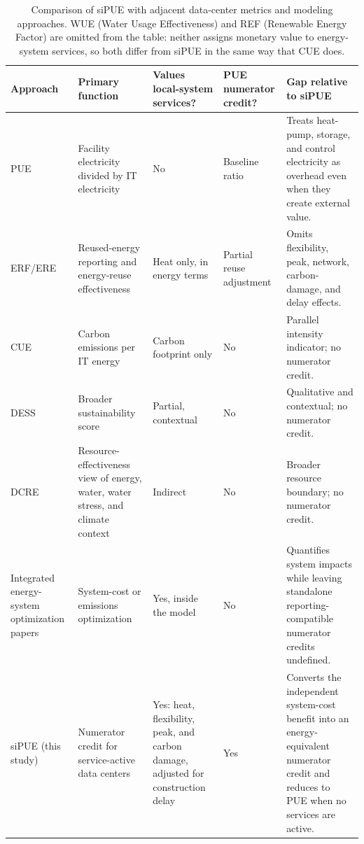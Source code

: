 \documentclass[preprint,12pt]{elsarticle}
\begin{document}
\begin{table}[tbp]
\centering
\scriptsize
\setlength{\tabcolsep}{3pt}
\renewcommand{\arraystretch}{1.12}
\caption{Comparison of siPUE with adjacent data-center metrics and modeling approaches. WUE (Water Usage Effectiveness) and REF (Renewable Energy Factor) are omitted from the table: neither assigns monetary value to energy-system services, so both differ from siPUE in the same way that CUE does.}
\label{tab:metric-novelty-comparison}
\begin{tabularx}{\linewidth}{L{2.05cm} L{2.25cm} L{1.65cm} L{1.85cm} Y}
\toprule
Approach & Primary function & Values local-system services? & PUE numerator credit? & Gap relative to siPUE \\
\midrule
PUE \cite{Belady2008PUE,EUDataCenterDirective2023} & Facility electricity divided by IT electricity & No & Baseline ratio & Treats heat-pump, storage, and control electricity as overhead even when they create external value. \\
ERF/ERE \cite{EUDataCenterDirective2023} & Reused-energy reporting and energy-reuse effectiveness & Heat only, in energy terms & Partial reuse adjustment & Omits flexibility, peak, network, carbon-damage, and delay effects. \\
CUE \cite{Reddy2017} & Carbon emissions per IT energy & Carbon footprint only & No & Parallel intensity indicator; no numerator credit. \\
DESS \cite{Terenius2023} & Broader sustainability score & Partial, contextual & No & Qualitative and contextual; no numerator credit. \\
DCRE \cite{GreenGrid2025DCRE} & Resource-effectiveness view of energy, water, water stress, and climate context & Indirect & No & Broader resource boundary; no numerator credit. \\
Integrated energy-system optimization papers \cite{JerezMonsalves2023,Wang2024} & System-cost or emissions optimization & Yes, inside the model & No & Quantifies system impacts while leaving standalone reporting-compatible numerator credits undefined. \\
siPUE (this study) & Numerator credit for service-active data centers & Yes: heat, flexibility, peak, and carbon damage, adjusted for construction delay & Yes & Converts the independent system-cost benefit into an energy-equivalent numerator credit and reduces to PUE when no services are active. \\
\bottomrule
\end{tabularx}
\end{table}
\end{document}

